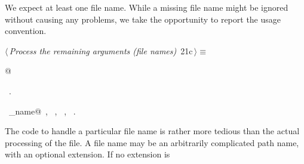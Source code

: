 \documentclass[a4paper]{report}
\begin{document}
We expect at least one file name. While a missing file name might be
ignored without causing any problems, we take the opportunity to report
the usage convention.
\begin{flushleft} \small
\begin{minipage}{\linewidth}\label{scrap31}\raggedright\small
{} $\langle\,${\it Process the remaining arguments (file names)}\nobreak\ {\footnotesize {21c}}$\,\rangle\equiv$
\vspace{-1ex}
\begin{list}{}{} \item
\mbox{}@{\NWsep}
\end{list}
\vspace{-1.5ex}
\footnotesize
\begin{list}{}{\setlength{\itemsep}{-\parsep}\setlength{\itemindent}{-\leftmargin}}
\item \NWtxtMacroRefIn\ .
\item \NWtxtIdentsUsed\nobreak\  \verb@command_name@\nobreak\ , \verb@exit@\nobreak\ , \verb@fprintf@\nobreak\ , \verb@stderr@\nobreak\ .
\item{}
\end{list}
\end{minipage}\vspace{4ex}
\end{flushleft}
\newpage
\noindent
The code to handle a particular file name is rather more tedious than
the actual processing of the file. A file name may be an arbitrarily
complicated path name, with an optional extension. If no extension is
\end{document}
